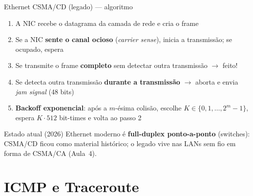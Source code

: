 \documentclass[aspectratio=169,11pt]{beamer}
\begin{document}
\begin{frame}{Ethernet CSMA/CD (legado) --- algoritmo}
  \begin{enumerate}
    \item A NIC recebe o datagrama da camada de rede e cria o frame
    \item Se a NIC \textbf{sente o canal ocioso} (\emph{carrier sense}), inicia a transmissão; se ocupado, espera
    \item Se transmite o frame \textbf{completo} sem detectar outra transmissão $\rightarrow$ \alert{feito!}
    \item Se detecta outra transmissão \textbf{durante a transmissão} $\rightarrow$ aborta e envia \emph{jam signal} (48 bits)
    \item \textbf{Backoff exponencial}: após a $m$-ésima colisão, escolhe $K\in\{0,1,\ldots,2^m-1\}$, espera $K\cdot 512$ bit-times e volta ao passo 2
  \end{enumerate}
  \begin{alertblock}{Estado atual (2026)}
    Ethernet moderno é \textbf{full-duplex ponto-a-ponto} (switches): CSMA/CD ficou como material histórico; o legado vive nas LANs sem fio em forma de \alert{CSMA/CA} (Aula~4).
  \end{alertblock}
\end{frame}

\section{ICMP e Traceroute}
\end{document}
